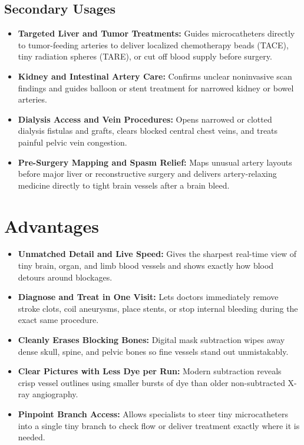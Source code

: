 \subsection{Secondary Usages}
\begin{itemize}
\item \textbf{Targeted Liver and Tumor Treatments:} Guides microcatheters directly to tumor-feeding arteries to deliver localized chemotherapy beads (TACE), tiny radiation spheres (TARE), or cut off blood supply before surgery.
\item \textbf{Kidney and Intestinal Artery Care:} Confirms unclear noninvasive scan findings and guides balloon or stent treatment for narrowed kidney or bowel arteries.
\item \textbf{Dialysis Access and Vein Procedures:} Opens narrowed or clotted dialysis fistulas and grafts, clears blocked central chest veins, and treats painful pelvic vein congestion.
\item \textbf{Pre-Surgery Mapping and Spasm Relief:} Maps unusual artery layouts before major liver or reconstructive surgery and delivers artery-relaxing medicine directly to tight brain vessels after a brain bleed.
\end{itemize}

\section{Advantages}
\begin{itemize}
\item \textbf{Unmatched Detail and Live Speed:} Gives the sharpest real-time view of tiny brain, organ, and limb blood vessels and shows exactly how blood detours around blockages.
\item \textbf{Diagnose and Treat in One Visit:} Lets doctors immediately remove stroke clots, coil aneurysms, place stents, or stop internal bleeding during the exact same procedure.
\item \textbf{Cleanly Erases Blocking Bones:} Digital mask subtraction wipes away dense skull, spine, and pelvic bones so fine vessels stand out unmistakably.
\item \textbf{Clear Pictures with Less Dye per Run:} Modern subtraction reveals crisp vessel outlines using smaller bursts of dye than older non-subtracted X-ray angiography.
\item \textbf{Pinpoint Branch Access:} Allows specialists to steer tiny microcatheters into a single tiny branch to check flow or deliver treatment exactly where it is needed.
\end{itemize}


